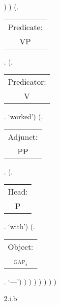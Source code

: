 \documentclass[12pt,letterpaper]{article}
\begin{document}
\begin{figure}
\begin{center}
\begin{parsetree}
			)
			)
			(.\begin{tabular}{c}Predicate:\\VP\end{tabular}.
			(.\begin{tabular}{c}Predicator:\\V\end{tabular}. `worked')
			(.\begin{tabular}{c}Adjunct:\\PP\end{tabular}.
			(.\begin{tabular}{c}Head:\\P\end{tabular}. `with')
			(.\begin{tabular}{c}Object:\\\textsc{gap}$_i$\end{tabular}. `---')
			)
			)
			)
			)
			)
			)
			)
			
			\hfill \break\hfill \break
			\end{parsetree}
			2.i.b
		\end{center}
	\end{figure}
\end{document}
